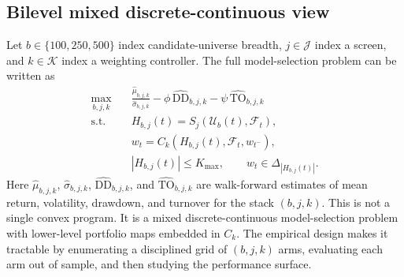 \documentclass[journal,10pt]{IEEEtran}
\begin{document}
\subsection{Bilevel mixed discrete-continuous view}
Let $b\in\{100,250,500\}$ index candidate-universe breadth, $j\in\mathcal{J}$ index a screen, and $k\in\mathcal{K}$ index a weighting controller. The full model-selection problem can be written as
\begin{equation}
\begin{aligned}
\max_{b,j,k}\quad & \frac{\widehat{\mu}_{b,j,k}}{\widehat{\sigma}_{b,j,k}} - \phi\,\widehat{\text{DD}}_{b,j,k} - \psi\,\widehat{\text{TO}}_{b,j,k}\\
\text{s.t.}\quad & H_{b,j}(t)=S_j(\mathcal{U}_b(t),\mathcal{F}_t),\\
& w_t=C_k(H_{b,j}(t),\mathcal{F}_t,w_{t^-}),\\
& |H_{b,j}(t)|\le K_{\max},\qquad w_t\in\Delta_{|H_{b,j}(t)|}.
\end{aligned}
\label{eq:bilevel_stack}
\end{equation}
Here $\widehat{\mu}_{b,j,k}$, $\widehat{\sigma}_{b,j,k}$, $\widehat{\text{DD}}_{b,j,k}$, and $\widehat{\text{TO}}_{b,j,k}$ are walk-forward estimates of mean return, volatility, drawdown, and turnover for the stack $(b,j,k)$. This is not a single convex program. It is a mixed discrete-continuous model-selection problem with lower-level portfolio maps embedded in $C_k$. The empirical design makes it tractable by enumerating a disciplined grid of $(b,j,k)$ arms, evaluating each arm out of sample, and then studying the performance surface.
\end{document}
